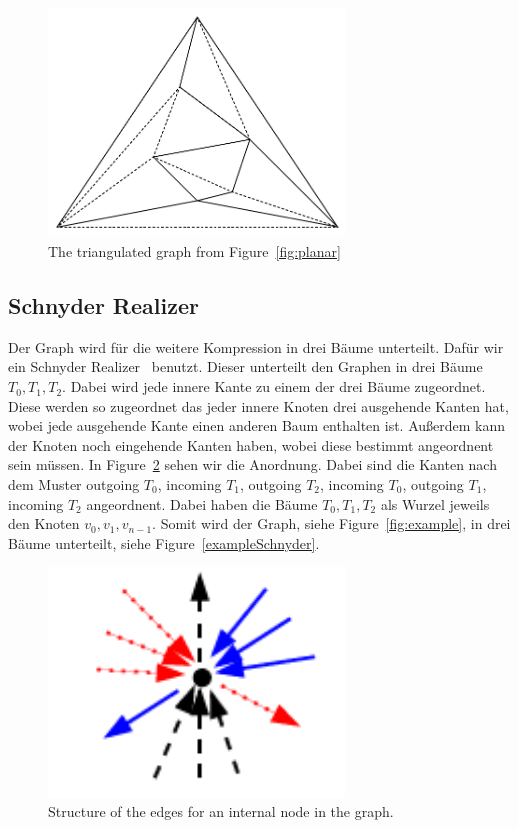 \documentclass[a4paper]{scrartcl}
\begin{document}
\begin{figure}[h]
	\centering
	\includegraphics[width=0.7\textwidth]{img/triangulated}
	\caption{The triangulated  graph from Figure~\ref{fig:planar}}
	\label{fig:triangulated}
\end{figure}

\subsection{Schnyder Realizer}
Der Graph wird für die weitere Kompression in drei Bäume unterteilt. Dafür wir ein Schnyder Realizer~\cite{schnyder} benutzt. Dieser unterteilt den Graphen in drei Bäume $T_0,T_1,T_2$. Dabei wird jede innere Kante zu einem der drei Bäume zugeordnet. Diese werden so zugeordnet das jeder innere Knoten drei ausgehende Kanten hat, wobei jede ausgehende Kante einen anderen Baum enthalten ist.  Außerdem kann der Knoten noch eingehende Kanten haben, wobei diese bestimmt angeordnent sein müssen. In Figure~\ref{fig:schnyderRealizer} sehen wir die Anordnung. Dabei sind die Kanten nach dem Muster outgoing $T_0$, incoming $T_1$, outgoing $T_2$, incoming $T_0$, outgoing $T_1$, incoming $T_2$ angeordnent. Dabei haben die Bäume $T_0,T_1,T_2$ als Wurzel jeweils den Knoten  $v_0,v_1,v_{n-1}$.
Somit wird der Graph, siehe Figure~\ref{fig:example}, in drei Bäume unterteilt, siehe Figure~\ref{exampleSchnyder}.
\begin{figure}[h]
	\centering
	\includegraphics[width=0.7\textwidth]{img/schnyderRealizer}
	\caption{Structure of the edges for an internal node in the graph. }
	\label{fig:schnyderRealizer}
\end{figure}
\end{document}
